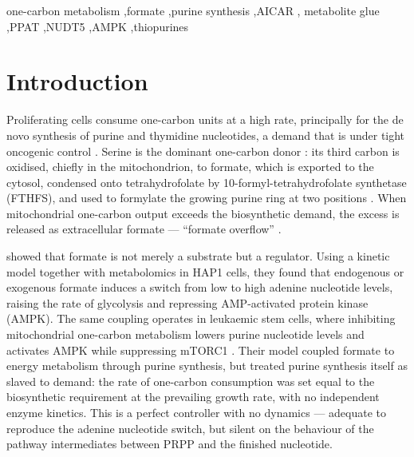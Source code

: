 \documentclass[a4paper,fleqn]{cas-sc}
\begin{document}

\begin{keywords}
one-carbon metabolism \sep formate \sep purine synthesis \sep AICAR \sep
metabolite glue \sep PPAT \sep NUDT5 \sep AMPK \sep thiopurines
\end{keywords}

\maketitle

\section{Introduction}

Proliferating cells consume one-carbon units at a high rate, principally for the
de novo synthesis of purine and thymidine nucleotides, a demand that is under
tight oncogenic control \citep{vidalcruchez2026}. Serine is the dominant
one-carbon donor \citep{yang2016}: its third carbon is oxidised, chiefly in the
mitochondrion, to formate, which is exported to the cytosol, condensed onto
tetrahydrofolate by 10-formyl-tetrahydrofolate synthetase (FTHFS), and used to
formylate the growing purine ring at two positions
\citep{ducker2017,tibbetts2010}. When mitochondrial one-carbon output exceeds the
biosynthetic demand, the excess is released as extracellular formate ---
``formate overflow'' \citep{meiser2018}.

\citet{oizel2020} showed that formate is not merely a substrate but a regulator.
Using a kinetic model together with metabolomics in HAP1 cells, they found that
endogenous or exogenous formate induces a switch from low to high adenine
nucleotide levels, raising the rate of glycolysis and repressing AMP-activated
protein kinase (AMPK). The same coupling operates in leukaemic stem cells, where
inhibiting mitochondrial one-carbon metabolism lowers purine nucleotide levels
and activates AMPK while suppressing mTORC1 \citep{zarou2024}. Their model
coupled formate to energy metabolism through
purine synthesis, but treated purine synthesis itself as slaved to demand: the
rate of one-carbon consumption was set equal to the biosynthetic requirement at
the prevailing growth rate, with no independent enzyme kinetics. This is a
perfect controller with no dynamics --- adequate to reproduce the adenine
nucleotide switch, but silent on the behaviour of the pathway intermediates
between PRPP and the finished nucleotide.
\end{document}
